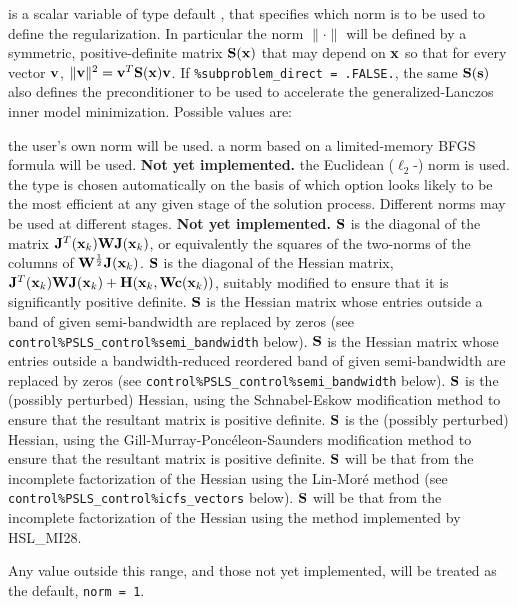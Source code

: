\documentclass{galahad}
\begin{document}
\begin{description}
 is a scalar variable of type default \integer,
that specifies which norm is to be used to define the regularization.
In particular the norm $\|\cdot\|$ will be defined by a symmetric,
positive-definite matrix ${\mathbf{S}}({\mathbf{x}})$ that may depend on ${\mathbf{x}}$
so that for every vector ${\mathbf{v}}$, $\|{\mathbf{v}}\|^2 = {\mathbf{v}}^T {\mathbf{S}}({\mathbf{x}}) {\mathbf{v}}$.
If {\tt \%subproblem\_direct = .FALSE.}, the same ${\mathbf{S}}({\mathbf{s}})$ also defines the
preconditioner to be used to accelerate the generalized-Lanczos
inner model minimization.  Possible values are:


\begin{description}
 the user's own norm will be used.
 a norm based on a limited-memory BFGS formula will be used.
        {\bf Not yet implemented.}
 the Euclidean ($\ell_2$-) norm is used.
 the type is chosen automatically on the basis of which option looks
        likely to be the most efficient at any given stage of the solution
        process. Different norms may be used at different stages.
        {\bf Not yet implemented.}
 ${\mathbf{S}}$ is the diagonal of the matrix ${\mathbf{J}}^T({\mathbf{x}}_k) {\mathbf{W}} {\mathbf{J}}({\mathbf{x}}_k)$,
        or equivalently the squares of the two-norms of the columns of
        ${\mathbf{W}}^{{\scriptstyle \frac{1}{2}}} {\mathbf{J}}({\mathbf{x}}_k)$.
 ${\mathbf{S}}$ is the diagonal of the Hessian matrix,
        ${\mathbf{J}}^T({\mathbf{x}}_k) {\mathbf{W}} {\mathbf{J}}({\mathbf{x}}_k) + {\mathbf{H}}({\mathbf{x}}_k,{\mathbf{W}}{\mathbf{c}}({\mathbf{x}}_k))$,
        suitably modified to ensure that it is significantly positive definite.
 ${\mathbf{S}}$ is the Hessian matrix whose entries outside a band of
         given semi-bandwidth are replaced by zeros
        (see {\tt control\%PSLS\_control\%semi\_bandwidth} below).
 ${\mathbf{S}}$ is the Hessian matrix whose entries outside a
        bandwidth-reduced reordered band of given semi-bandwidth are
        replaced by zeros
        (see {\tt control\%PSLS\_control\%semi\_bandwidth} below).
 ${\mathbf{S}}$ is the (possibly perturbed) Hessian,
         using the Schnabel-Eskow modification
        method to ensure that the resultant matrix is positive definite.
 ${\mathbf{S}}$ is the (possibly perturbed) Hessian,
        using the Gill-Murray-Ponc\'{e}leon-Saunders
        modification method to ensure that the resultant matrix is
        positive definite.
 ${\mathbf{S}}$ will be that from the incomplete factorization of the Hessian
        using the Lin-Mor\'{e} method
        (see {\tt control\%PSLS\-\_control\%icfs\_vectors} below).
 ${\mathbf{S}}$ will be that from the incomplete factorization of the Hessian
        using the method implemented by HSL\_MI28.
\end{description}
Any value outside this range, and those not yet implemented, will be
treated as the default, {\tt norm = 1}.


\end{description}
\end{document}
